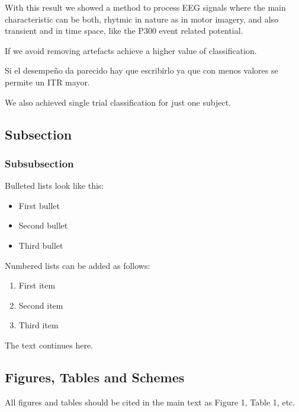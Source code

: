 \documentclass[entropy,article,submit,moreauthors,pdftex,10pt,a4paper]{mdpi}
\begin{document}
With this result we showed a method to process EEG signals where the main characteristic can be both, rhytmic in nature as in motor imagery, and also transient and in time space, like the P300 event related potential.

If we avoid removing artefacts achieve a higher value of classification.

Si el desempeño da parecido hay que escribirlo ya que con menos valores se permite un ITR mayor.

We also achieved single trial classification for just one subject.


\subsection{Subsection}

\subsubsection{Subsubsection}

Bulleted lists look like this:
\begin{itemize}[leftmargin=*,labelsep=4mm]
\item	First bullet
\item	Second bullet
\item	Third bullet
\end{itemize}

Numbered lists can be added as follows:
\begin{enumerate}[leftmargin=*,labelsep=3mm]
\item	First item
\item	Second item
\item	Third item
\end{enumerate}

The text continues here.

\subsection{Figures, Tables and Schemes}

All figures and tables should be cited in the main text as Figure 1, Table 1, etc.
\end{document}
